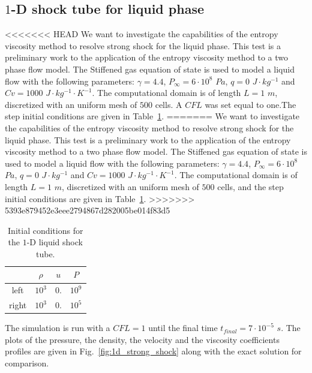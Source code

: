 \documentclass[preprint,10pt]{elsarticle}
\newcommand{\fig}[1]{Fig.~\ref{#1}}                      %
\newcommand{\tbl}[1]{Table~\ref{#1}}                     %
\begin{document}
\subsection{$1$-D shock tube for liquid phase} \label{sec:liquid_shock}
<<<<<<< HEAD
We want to investigate the capabilities of the entropy viscosity method to resolve strong shock for the liquid phase. This test is a preliminary work to the application of the entropy viscosity method to a two phase flow model. The Stiffened gas equation of state is used to model a liquid flow with the following parameters: $\gamma = 4.4$, $P_{\infty} = 6 \cdot 10^8$ $Pa$, $q = 0$ $J \cdot kg^{-1}$ and $Cv = 1000$ $J \cdot kg^{-1} \cdot K^{-1}$. The computational domain is of length $L=1$ $m$, discretized with an uniform mesh of $500$ cells. A $CFL$ was set equal to one.The step initial conditions are given in \tbl{tbl:ic_strong_shock}.
=======
We want to investigate the capabilities of the entropy viscosity method to resolve strong shock for the liquid phase. This test is a preliminary work to the application of the entropy viscosity method to a two phase flow model. The Stiffened gas equation of state is used to model a liquid flow with the following parameters: $\gamma = 4.4$, $P_\infty = 6 \cdot 10^8$ $Pa$, $q = 0$ $J \cdot kg^{-1}$ and $Cv = 1000$ $J \cdot kg^{-1} \cdot K^{-1}$. The computational domain is of length $L=1$ $m$, discretized with an uniform mesh of $500$ cells, and the step initial conditions are given in \tbl{tbl:ic_strong_shock}.
>>>>>>> 5393e879452e3eee2794867d282005be014f83d5
\begin{table}[H]
\begin{center}
 \caption{\label{tbl:ic_strong_shock} Initial conditions for the $1$-D liquid shock tube.}
 \begin{tabular}{|c|c|c|c|}
 \hline
   & $\rho$ & $u$ & $P$ \\
 \hline
left & $10^{3}$ & $0.$ & $10^9$ \\
  \hline
  right & $10^{3}$ & $0.$ & $10^5$ \\
  \hline
\end{tabular}
\end{center}
\end{table}
The simulation is run with a $CFL=1$ until the final time $t_{final} = 7 \cdot 10^{-5}$ $s$. The plots of the pressure, the density, the velocity and the viscosity coefficients profiles are given in \fig{fig:1d_strong_shock} along with the exact solution for comparison.
\end{document}
